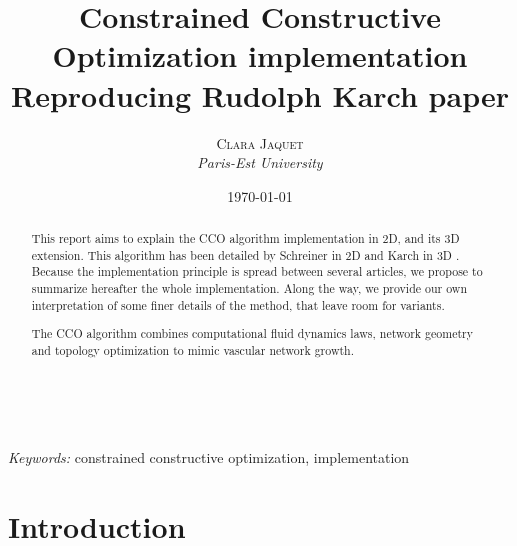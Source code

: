 \documentclass[a4paper, 11pt]{article} %
\title{\textbf{Constrained Constructive Optimization implementation}\\ %
Reproducing Rudolph Karch paper} %
\author{\textsc{Clara Jaquet} %
\\{\textit{Paris-Est University}}} %
\date{\today} %
\makeatletter
\renewcommand{\maketitle}{ %
\begin{flushright} %
{\LARGE\@title} %

\vspace{50pt} %

{\large\@author} %
\\\@date %

\vspace{40pt} %
\end{flushright}
}
\makeatother
\begin{document}
\maketitle %



\begin{abstract}
This report aims to explain the CCO algorithm implementation in 2D, and its 3D extension. This algorithm has been detailed by Schreiner in 2D \cite{schreiner1993computer} and Karch in 3D \cite{karch1999three}. Because the implementation principle is spread between several articles, we propose to summarize hereafter the whole implementation. Along the way, we provide our own interpretation of some finer details of the method, that leave room for variants.
 
The CCO algorithm combines computational fluid dynamics laws, network geometry and topology optimization to mimic vascular network growth.


\end{abstract}

\hspace*{3,6mm}\textit{Keywords:} constrained constructive optimization, implementation %

\vspace{30pt} %

\tableofcontents

\section*{Introduction}
\end{document}
